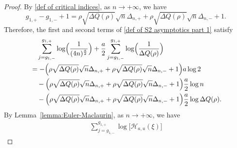 \documentclass[reqno]{amsart}
\newcommand{\1}{\mathds{1}}
\numberwithin{equation}{section}
\theoremstyle{definition}
\begin{document}
\begin{proof}

By \eqref{def of critical indices}, as $n\to+\infty$, we have 
\[
g_{1,+}-g_{1,-}+1
=
\rho\sqrt{\Delta Q(\rho)}\sqrt{n}\Delta_{n,+}
+\rho\sqrt{\Delta Q(\rho)}\sqrt{n}\Delta_{n,-}
+1.
\]
Therefore, the first and second terms of \eqref{def of S2 asymptotics part 1} satisfy 
\begin{align*}
&\quad
\sum_{j=g_{1,-}}^{g_{1,+}}\log\Bigl(\frac{1}{(4n)^{\frac{a}{2}}}\Bigr)
+
\frac{a}{2}
\sum_{j=g_{1,-}}^{g_{1,+}}\log\Bigl(\frac{1}{\Delta Q(\rho)}\Bigr)
\\
&=
-\Bigl( \rho\sqrt{\Delta Q(\rho)}\sqrt{n}\Delta_{n,+}
+\rho\sqrt{\Delta Q(\rho)}\sqrt{n}\Delta_{n,-}
+1\Bigr)
a\log2
\\
&\quad
-\Bigl( \rho\sqrt{\Delta Q(\rho)}\sqrt{n}\Delta_{n,+}
+\rho\sqrt{\Delta Q(\rho)}\sqrt{n}\Delta_{n,-}
+1\Bigr)\frac{a}{2}\log n
\\
&\quad
-\Bigl( \rho\sqrt{\Delta Q(\rho)}\sqrt{n}\Delta_{n,+}
+\rho\sqrt{\Delta Q(\rho)}\sqrt{n}\Delta_{n,-}
+1\Bigr)\frac{a}{2}\log \Delta Q(\rho).
\end{align*}
By Lemma~\ref{lemma:Euler-Maclaurin}, as $n\to+\infty$, we have 
\begin{align*}
\sum_{j=g_{1,-}}^{g_{1,+}}
\log \bigl[\mathcal{H}_{a,u}(\xi)\bigr] 

\end{align*}
\end{proof}
\end{document}

